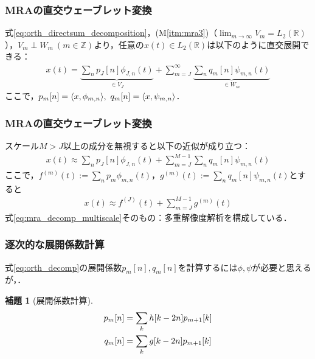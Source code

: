 \documentclass[dvipdfmx,graphicx,14pt]{beamer}
\newcommand{\roverline}[1]{\mathpalette\doroverline{#1}}
\newcommand{\doroverline}[2]{\overline{#1#2}}
\newtheorem{mylemma}{補題}
\begin{document}
\begin{frame}[c]
    \frametitle{MRAの直交ウェーブレット変換}
    式\eqref{eq:orth_directsum_decomposition}，(M\ref{itm:mra3})（$\lim_{m\to\infty} V_{m} = L_{2}(\mathbb{R})$），$V_{m} \perp W_{m}\ (m \in \mathbb{Z})$より，任意の$x(t) \in L_{2}(\mathbb{R})$は以下のように直交展開できる：
    \begin{align}
        x(t) = \underbrace{\sum_{n} p_{J}[n] \phi_{J,n}(t)}_{\in V_{J}} + \sum_{m=J}^{\infty} \underbrace{\sum_{n} q_{m}[n] \psi_{m,n}(t)}_{\in W_{m}} \label{eq:orth_decomp}
    \end{align}
    ここで，$p_{m}[n] = \langle x, \phi_{m,n} \rangle,\ q_{m}[n] = \langle x, \psi_{m,n} \rangle$．
\end{frame}

\begin{frame}[c]
    \frametitle{MRAの直交ウェーブレット変換}
    スケール$M > J$以上の成分を無視すると以下の近似が成り立つ：
    \begin{align}
        x(t) \approx \sum_{n} p_{J}[n] \phi_{J,n}(t) + \sum_{m=J}^{M-1}\sum_{n} q_{m}[n] \psi_{m,n}(t) \label{eq:orth_approx}
    \end{align}
    ここで，$f^{(m)}(t) := \sum_{n} p_{m} \phi_{m,n}(t)$，$g^{(m)}(t) := \sum_{n} q_{m}[n] \psi_{m,n}(t)$とすると
    \begin{align*}
        x(t) \approx f^{(J)}(t) + \sum_{m=J}^{M-1} g^{(m)}(t)
    \end{align*}
    式\eqref{eq:mra_decomp_multiscale}そのもの：多重解像度解析を構成している．
\end{frame}

\begin{frame}[c]
    \frametitle{逐次的な展開係数計算}
    式\eqref{eq:orth_decomp}の展開係数$p_{m}[n], q_{m}[n]$を計算するには$\phi, \psi$が必要と思えるが，．
    \begin{mylemma}[展開係数計算]
        \vspace*{-15pt}
        \begin{align}
            p_{m}[n] &= \sum_{k} \roverline{h[k - 2n]} p_{m+1}[k] \label{eq:scaling_coef_updation} \\
            q_{m}[n] &= \sum_{k} \roverline{g[k - 2n]} p_{m+1}[k] \label{eq:wavelet_coef_updation}
        \end{align}
    \end{mylemma}
\end{frame}
\end{document}
